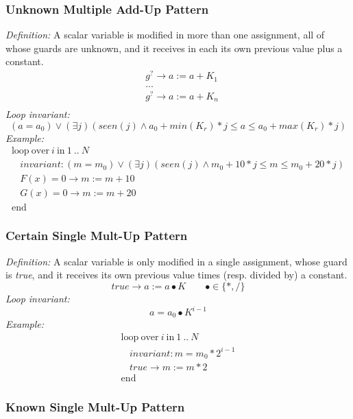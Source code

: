 \documentclass[a4paper,10pt]{article}
\newcommand{\KWloop}{\ensuremath{\mathrm{loop}~}}
\newcommand{\KWend}{\ensuremath{\mathrm{end}~}}
\newcommand{\KWover}{\ensuremath{\mathrm{over}~}}
\newcommand{\KWin}{\ensuremath{~\mathrm{in}~}}
\newcommand{\seen}[1]{\ensuremath{\mathit{seen}(#1)}\xspace}
\newcommand{\loopinvariant}{\noindent\textit{Loop invariant:}\xspace}
\newcommand{\patterndef}{\noindent\textit{Definition:}\xspace}
\newcommand{\patternexample}{\noindent\textit{Example:}\xspace}
\begin{document}
\subsubsection*{Unknown Multiple Add-Up Pattern}

\patterndef A scalar variable is modified in more than one assignment, all of
whose guards are unknown, and it receives in each its own previous value
plus a constant.
%
\begin{eqnarray*}
&g^? \rightarrow a := a + K_1\\
&...\\
&g^? \rightarrow a := a + K_n\\
\end{eqnarray*}
%
\loopinvariant
%
$$(a = a_0) \lor (\exists j)(\seen{j} \land a_0 + \mathit{min}(K_r) * j \leq a \leq a_0 + \mathit{max}(K_r) * j)$$
%
\patternexample
$$\begin{array}{l}
  \KWloop \KWover i \KWin 1~..~N \\
  ~~~~ \textit{invariant}: (m = m_0) \lor (\exists j)(\seen{j} \land m_0+10*j \leq m \leq m_0 +20*j)\\
  ~~~~ F(x)=0 \rightarrow m := m+10\\
  ~~~~ G(x)=0 \rightarrow m := m+20\\
  \KWend
\end{array}$$

\subsubsection*{Certain Single Mult-Up Pattern}

\patterndef A scalar variable is only modified in a single assignment, whose
guard is \textit{true}, and it receives its own previous value times
(resp. divided by) a constant.
%
$$\mathit{true} \rightarrow a := a \bullet K \qquad \bullet \in \{*, / \}$$
%
\loopinvariant
%
$$a = a_0 \bullet K^{i-1}$$
%
\patternexample
$$\begin{array}{l}
  \KWloop \KWover i \KWin 1~..~N \\
  ~~~~ \textit{invariant}: m = m_0 * 2^{i-1}\\
  ~~~~ true \rightarrow m := m*2\\
  \KWend
\end{array}$$

\subsubsection*{Known Single Mult-Up Pattern}
\end{document}
